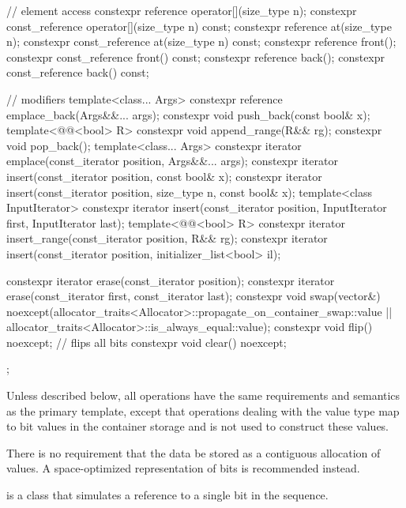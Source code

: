 \begin{codeblock}
{{    // element access
    constexpr reference       operator[](size_type n);
    constexpr const_reference operator[](size_type n) const;
    constexpr reference       at(size_type n);
    constexpr const_reference at(size_type n) const;
    constexpr reference       front();
    constexpr const_reference front() const;
    constexpr reference       back();
    constexpr const_reference back() const;

    // modifiers
    template<class... Args> constexpr reference emplace_back(Args&&... args);
    constexpr void push_back(const bool& x);
    template<@@<bool> R>
      constexpr void append_range(R&& rg);
    constexpr void pop_back();
    template<class... Args> constexpr iterator emplace(const_iterator position, Args&&... args);
    constexpr iterator insert(const_iterator position, const bool& x);
    constexpr iterator insert(const_iterator position, size_type n, const bool& x);
    template<class InputIterator>
      constexpr iterator insert(const_iterator position,
                                InputIterator first, InputIterator last);
    template<@@<bool> R>
      constexpr iterator insert_range(const_iterator position, R&& rg);
    constexpr iterator insert(const_iterator position, initializer_list<bool> il);

    constexpr iterator erase(const_iterator position);
    constexpr iterator erase(const_iterator first, const_iterator last);
    constexpr void swap(vector&)
      noexcept(allocator_traits<Allocator>::propagate_on_container_swap::value ||
               allocator_traits<Allocator>::is_always_equal::value);
    constexpr void flip() noexcept;     // flips all bits
    constexpr void clear() noexcept;
  };
}
\end{codeblock}%

\pnum
Unless described below, all operations have the same requirements and
semantics as the  primary template, except that operations
dealing with the  value type map to bit values in the
container storage and
is not used to construct these values.

\pnum
There is no requirement that the data be stored as a contiguous allocation
of  values. A space-optimized representation of bits is
recommended instead.

\pnum
{}
is a class that simulates a reference to a single bit in the sequence.

